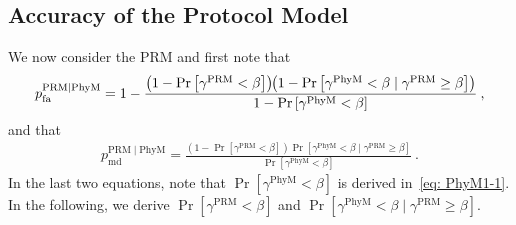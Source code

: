 \documentclass[12pt, draftclsnofoot, onecolumn]{IEEEtran}
\begin{document}
\subsection{Accuracy of the Protocol Model}\label{subsec: example-1-PRM}
We now consider the PRM and first note that
\begin{align}\label{eq: false-alarm-prop2}
p_{\mathrm{fa}}^{{\mathrm{PRM}} \mid {\mathrm{PhyM}}} = 1 - \frac{\left( 1 - \Pr \left[\gamma^{\mathrm{PRM}} < \beta \right] \right) \hspace{-1mm} \left( 1- \Pr \left[\gamma^{\mathrm{PhyM}} < \beta \mid \gamma^{\mathrm{PRM}} \geq \beta \right]\right)}{1 - \Pr \left[\gamma^{\mathrm{PhyM}} < \beta \right]} \:,
\end{align}
and that
{\begin{align}\label{eq: misdetection-prop-2}
p_{\mathrm{md}}^{{\mathrm{PRM}} \mid {\mathrm{PhyM}}} = \frac{ \left(1 -  \Pr \left[\gamma^{\mathrm{PRM}} < \beta \right] \right) \Pr \left[\gamma^{\mathrm{PhyM}} < \beta \mid \gamma^{\mathrm{PRM}} \geq \beta \right]}{\Pr \left[\gamma^{\mathrm{PhyM}} < \beta \right]} \:.
\end{align}}
In the last two equations, note that $\Pr[\gamma^{\mathrm{PhyM}} < \beta ]$ is derived in~\eqref{eq: PhyM1-1}.
In the following, we derive $\Pr[\gamma^{\mathrm{PRM}} < \beta ]$ and $\Pr \left[\gamma^{\mathrm{PhyM}} < \beta \mid \gamma^{\mathrm{PRM}} \geq \beta \right]$.
\end{document}

